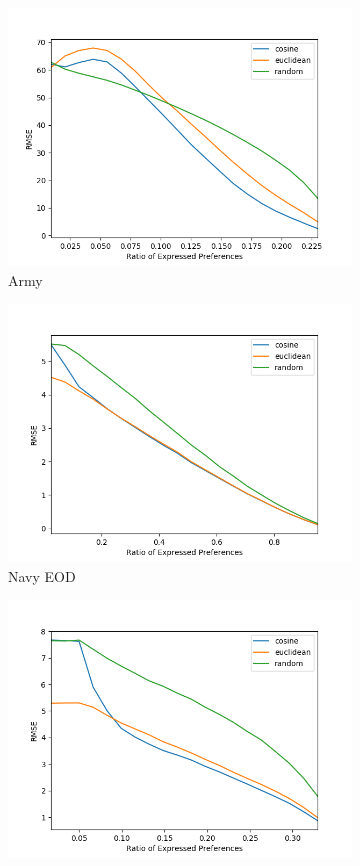 \begin{figure}
\begin{subfigure}{.5\textwidth}
  \centering
  \includegraphics[width=.8\linewidth]{Sections/Plots/army.png}
  \caption{Army}
  \label{fig:army}
\end{subfigure}%
\begin{subfigure}{.5\textwidth}
  \centering
  \includegraphics[width=.8\linewidth]{Sections/Plots/eod.png}
  \caption{Navy EOD}
  \label{fig:eod}
\end{subfigure}
\begin{subfigure}{.5\textwidth}
  \centering
  \includegraphics[width=.8\linewidth]{Sections/Plots/med_s.png}

\end{subfigure}
\end{figure}
